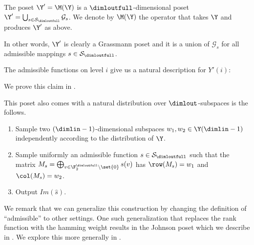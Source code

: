 \begin{definition} \label{def:matrix-poset}
    The poset \(\Y' = \M(\Y)\) is a \(\dimloutfull\)-dimensional poset 
    \(\Y' = \bigcup_{s \in \mathcal{S}_\dimloutfull} \mathcal{G}_{s}\).
    We denote by \(\M(\Y)\) the operator that takes \(\Y\) and produces \(\Y'\) as above. %
\end{definition}
In other words, \(\Y'\) is clearly a Grassmann poset and it is a union of \(\mathcal{G}_s\) for all admissible mappings \(s \in \mathcal{S}_{\dimloutfull}\).

The admissible functions on level \(i\) give us a natural description for \(Y'(i)\):
\begin{claim} \end{claim}
We prove this claim in . 

This poset also comes with a natural distribution over \(\dimlout\)-subspaces is the follows.
\begin{enumerate}
    \item Sample two \((\dimlin-1)\)-dimensional subspaces \(w_1,w_2 \in \Y(\dimlin-1)\) independently according to the distribution of \(\Y\). %
    \item Sample uniformly an admissible function \(s \in \mathcal{S}_{\dimloutfull}\) such that the matrix \(M_s = \bigoplus_{v \in \F_2^\dimloutfull\setminus \set{0}} s(v)\) has \(\row(M_s) = w_1\) and \(\col(M_s) = w_2\).
    \item Output \(Im(\widehat{s})\).
\end{enumerate}

We remark that we can generalize this construction by changing the definition of ``admissible'' to other settings. One such generalization that replaces the rank function with the hamming weight results in the Johnson poset which we describe in . We explore this more generally in .

